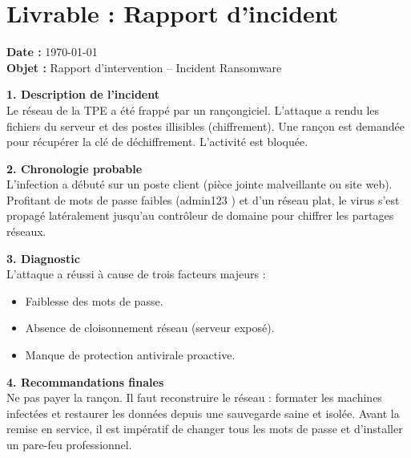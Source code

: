 \documentclass[a4paper,12pt]{article}
\begin{document}
\section*{Livrable : Rapport d'incident}

\textbf{Date :} \today \\
\textbf{Objet :} Rapport d'intervention -- Incident Ransomware

\vspace{0.5cm}

\textbf{1. Description de l'incident} \\
Le réseau de la TPE a été frappé par un rançongiciel. L'attaque a rendu les fichiers du serveur et des postes illisibles (chiffrement). Une rançon est demandée pour récupérer la clé de déchiffrement. L'activité est bloquée.

\vspace{0.3cm}

\textbf{2. Chronologie probable} \\
L'infection a débuté sur un poste client (pièce jointe malveillante ou site web). Profitant de mots de passe faibles (\og admin123 \fg{}) et d'un réseau plat, le virus s'est propagé latéralement jusqu'au contrôleur de domaine pour chiffrer les partages réseaux.

\vspace{0.3cm}

\textbf{3. Diagnostic} \\
L'attaque a réussi à cause de trois facteurs majeurs :
\begin{itemize}
    \item Faiblesse des mots de passe.
    \item Absence de cloisonnement réseau (serveur exposé).
    \item Manque de protection antivirale proactive.
\end{itemize}

\vspace{0.3cm}

\textbf{4. Recommandations finales} \\
Ne pas payer la rançon. Il faut reconstruire le réseau : formater les machines infectées et restaurer les données depuis une sauvegarde saine et isolée. Avant la remise en service, il est impératif de changer tous les mots de passe et d'installer un pare-feu professionnel.
\end{document}

